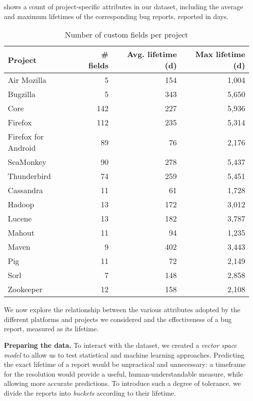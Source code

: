   shows a count of project-specific attributes in our dataset, including the average and maximum lifetimes of the corresponding bug reports, reported in days.

\begin{table}[ht]
\centering
\caption{Number of custom fields per project}
\begin{tabular}{l|rrr}
\textbf{Project} & \textbf{\# fields} & \textbf{Avg. lifetime (d)} & \textbf{Max lifetime (d)} \\
 \hline
Air Mozilla & 5 & 154 & 1,004 \\
Bugzilla & 5 & 343 & 5,650 \\
Core & 142 & 227 & 5,936 \\
Firefox & 112 & 235 & 5,314 \\
Firefox for Android & 89 & 76 & 2,176 \\
SeaMonkey & 90 & 278 & 5,437 \\
Thunderbird & 74 & 259 & 5,451 \\
\hline
Cassandra & 11 & 61 & 1,728 \\
Hadoop & 13 & 172 & 3,012 \\
Lucene & 13 & 182 & 3,787 \\
Mahout & 11 & 94 & 1,235 \\
Maven & 9 & 402 & 3,443 \\
Pig & 11 & 72 & 2,149 \\
Sorl & 7 & 148 & 2,858 \\
Zookeeper & 12 & 158 & 2,108 \\
\hline
\end{tabular}
\label{tab:project-fields}
\end{table}


We now explore the relationship between the various attributes adopted by the different platforms and projects we considered and the effectiveness of a bug report, measured as its lifetime.




{\bfseries Preparing the data.} To interact with the dataset, we created a \emph{vector space model} to allow us to test statistical and machine learning approaches. Predicting the exact lifetime of a report would be unpractical and unnecessary: a timeframe for the resolution would provide a useful, human-understandable measure, while allowing more accurate predictions. To introduce such a degree of tolerance, we divide the reports into \emph{buckets} according to their lifetime.

